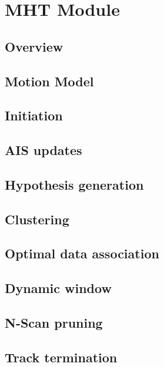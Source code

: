 
\chapter{MHT Module}\label{chapter:mht-module}

\section{Overview}

\section{Motion Model}\label{sec:motion-model}

\section{Initiation}

\section{AIS updates}

\section{Hypothesis generation}

\section{Clustering}

\section{Optimal data association}


\section{Dynamic window}

\section{N-Scan pruning}

\section{Track termination}